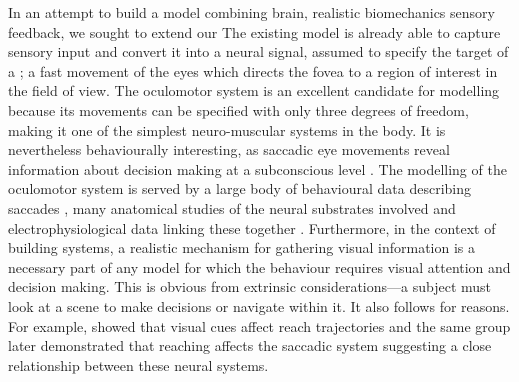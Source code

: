 \documentclass{frontiersSCNS}
\begin{document}
In an attempt to build a model combining brain, realistic
biomechanics  sensory feedback, we sought to extend our
%
The existing
model \citep{cope_basal_2017} is already able to capture sensory input
and convert it into a neural signal, assumed to specify the target of
a ; a fast movement of the eyes which directs
the fovea to a region of interest in the field of view.
%
The oculomotor system is an excellent candidate for modelling because
its movements can be specified with only three degrees of freedom,
making it one of the simplest neuro-muscular systems in the body.
%
It is nevertheless behaviourally interesting, as saccadic eye
movements reveal information about decision making at a subconscious
level
\citep{deubel_saccade_1996,reppert_modulation_2015,marcos_determining_2016}.
The modelling of the oculomotor system is served by a large body of
behavioural data describing
saccades \citep{tipper_reaching_2001,walker_effect_1997,casteau_effect_2012},
many anatomical studies of the neural substrates involved
\citep{meredith_intrinsic_1998,isa_intrinsic_2002,isa_exploring_2009}
and electrophysiological data linking these together
\citep{hepp_spatio-temporal_1983,dorris_neuronal_1997,mcpeek_competition_2003,vokoun_circuit_2011}.
Furthermore, in the context of building  systems, a
realistic mechanism for gathering visual information is a necessary
part of any model for which the behaviour requires visual attention
and decision making.  This is obvious from extrinsic
considerations---a subject must look at a scene to make decisions or
navigate within it. It also follows for  reasons. For
example, \cite{howard_hand_1997} showed that visual cues affect reach
trajectories and the same group later demonstrated that reaching
affects the saccadic system
\citep{tipper_reaching_2001} suggesting a close relationship between these
neural systems. 
\end{document}
